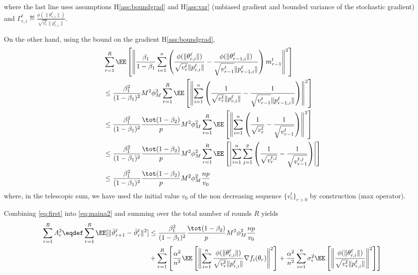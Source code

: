 \documentclass[11pt]{article}
\begin{document}
where the last line uses assumptions H\ref{ass:boundgrad} and H\ref{ass:var} (unbiased gradient and bounded variance of the stochastic gradient) and $\Gamma_{r,i}^\ell \eqdef  \frac{\phi(\|\theta_{r,i}^{\ell}\|)}{\sqrt{v^{t}_{r}} \|p_{r,i}^{\ell}\|} $.

On the other hand, using the bound on the gradient H\ref{ass:boundgrad},
\begin{align}\label{eq:first}
\begin{split}
& \sum_{r=1}^R \EE \left[ \left\| \frac{ \beta_1}{1-\beta_1}  \sum_{i = 1}^n  \left( \frac{\phi(\|\theta_{r,i}^{\ell}\|)}{\sqrt{v^{t}_{r}} \|p_{r,i}^{\ell}\|} - \frac{\phi(\|\theta_{r-1,i}^{\ell}\|)}{\sqrt{v^{t}_{r-1}} \|p_{r-1,i}^{\ell}\|} \right) m^{t}_{r-1}\right\|^2 \right]  \\
& \leq   \frac{ \beta_1^2}{(1-\beta_1)^2} M^2 \phi^2_M \sum_{r=1}^R  \EE \left[  \left\| \sum_{i = 1}^n  \left( \frac{1}{\sqrt{v^{t}_{r}} \|p_{r,i}^{\ell}\|} - \frac{1}{\sqrt{v^{t}_{r-1}} \|p_{r-1,i}^{\ell}\|} \right) \right\|^2 \right]\\
& \leq   \frac{ \beta_1^2}{(1-\beta_1)^2} \frac{\tot(1-\beta_2)}{ p}  M^2 \phi^2_M \sum_{r=1}^R  \EE \left[  \left\| \sum_{i = 1}^n  \left( \frac{1}{\sqrt{v^{t}_{r}}} - \frac{1}{\sqrt{v^{t}_{r-1}}} \right) \right\|^2 \right]\\
& \leq   \frac{ \beta_1^2}{(1-\beta_1)^2} \frac{\tot(1-\beta_2)}{ p}  M^2 \phi^2_M \sum_{r=1}^R  \EE \left[  \left| \sum_{i = 1}^n  \sum_{j= 1}^p  \left( \frac{1}{\sqrt{v^{t,j}_{r}}} - \frac{1}{\sqrt{v^{t,j}_{r-1}}} \right) \right| \right]\\
& \leq   \frac{ \beta_1^2}{(1-\beta_1)^2} \frac{\tot(1-\beta_2)}{ p}  M^2 \phi^2_M \frac{n p}{v_0}
\end{split}
\end{align}
where, in the telescopic sum, we have used the initial value $v_0$ of the non decreasing sequence $\{v^t_r\}_{r >0}$ by construction (max operator).
 
Combining \eqref{eq:first} into \eqref{eq:maina2} and summing over the total number of rounds $R$ yields
\begin{align}\label{eq:finala2}
\begin{split}
\sum_{r=1}^R A_r^2 \eqdef \sum_{r=1}^R \EE[  \| \bar{\vartheta}^\ell_{r+1} - \bar{\vartheta}^\ell_r \|^2] & \leq \frac{ \beta_1^2}{(1-\beta_1)^2} \frac{\tot(1-\beta_2)}{ p}  M^2 \phi^2_M \frac{n p}{v_0} \\
& + \sum_{r=1}^R  \left[  \frac{\alpha^2}{n^2} \EE\left[ \left\| \sum_{i = 1}^n \frac{\phi(\|\theta_{r,i}^{\ell}\|)}{\sqrt{v^{t}_{r}} \|p_{r,i}^{\ell}\|}\nabla f_i(\theta_r) \right\|^2 \right] +  \frac{\alpha^2}{n^2} \sum_{i = 1}^n  \sigma_i^2 \EE\left[ \left\|\frac{\phi(\|\theta_{r,i}^{\ell}\|)}{\sqrt{v^{t}_{r}} \|p_{r,i}^{\ell}\|} \right\|^2 \right]\right]
\end{split}
\end{align}
\end{document}
